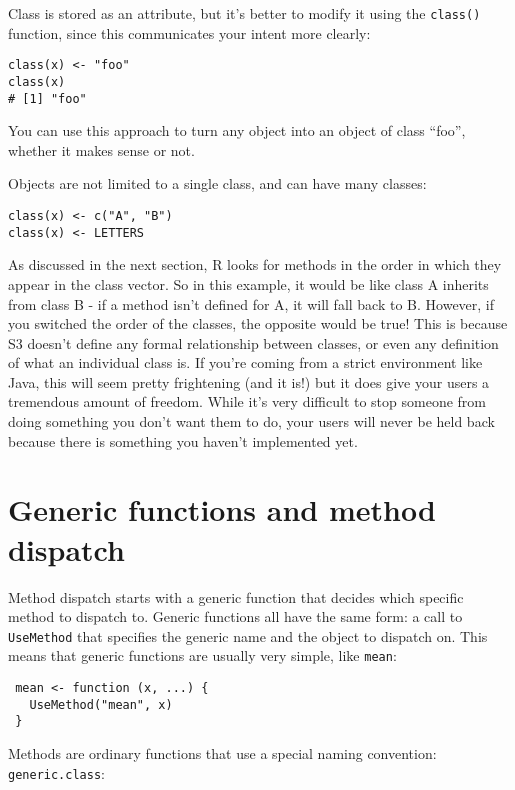 Class is stored as an attribute, but it's better to modify it using the
\texttt{class()} function, since this communicates your intent more
clearly:

\begin{verbatim}
class(x) <- "foo"
class(x)
# [1] "foo"
\end{verbatim}

You can use this approach to turn any object into an object of class
``foo'', whether it makes sense or not.

Objects are not limited to a single class, and can have many classes:

\begin{verbatim}
class(x) <- c("A", "B")
class(x) <- LETTERS
\end{verbatim}

As discussed in the next section, R looks for methods in the order in
which they appear in the class vector. So in this example, it would be
like class A inherits from class B - if a method isn't defined for A, it
will fall back to B. However, if you switched the order of the classes,
the opposite would be true! This is because S3 doesn't define any formal
relationship between classes, or even any definition of what an
individual class is. If you're coming from a strict environment like
Java, this will seem pretty frightening (and it is!) but it does give
your users a tremendous amount of freedom. While it's very difficult to
stop someone from doing something you don't want them to do, your users
will never be held back because there is something you haven't
implemented yet.

\hypertarget{generic-functions-and-method-dispatch}{%
\section{Generic functions and method
dispatch}\label{generic-functions-and-method-dispatch}}

Method dispatch starts with a generic function that decides which
specific method to dispatch to. Generic functions all have the same
form: a call to \texttt{UseMethod} that specifies the generic name and
the object to dispatch on. This means that generic functions are usually
very simple, like \texttt{mean}:

\begin{verbatim}
 mean <- function (x, ...) {
   UseMethod("mean", x)
 }
\end{verbatim}

Methods are ordinary functions that use a special naming convention:
\texttt{generic.class}:

